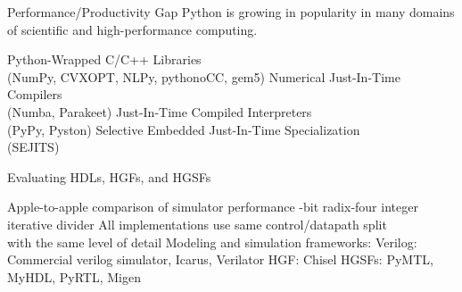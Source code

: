 \begin{frame}{Performance/Productivity Gap}
Python is growing in popularity in many domains of scientific and
high-performance computing. 

\medskip\hspace{0.15in}
\begin{cbxlist}
  \1 Python-Wrapped C/C++ Libraries \\
     (NumPy, CVXOPT, NLPy, pythonoCC, gem5)
  \1 Numerical Just-In-Time Compilers \\
     (Numba, Parakeet)
  \1 Just-In-Time Compiled Interpreters \\
     (PyPy, Pyston)
  \1 Selective Embedded Just-In-Time Specialization \\
     (SEJITS)
\end{cbxlist}

\end{frame}


%
%

\begin{frame}{Evaluating HDLs, HGFs, and HGSFs}
\begin{cbxlist}
  \1 Apple-to-apple comparison of simulator performance
  -bit radix-four integer iterative divider
  \1 All implementations use same control/datapath split \\ with the same
     level of detail
  \1 Modeling and simulation frameworks:
    \2 Verilog: Commercial verilog simulator, Icarus, Verilator
    \2 HGF: Chisel
    \2 HGSFs: PyMTL, MyHDL, PyRTL, Migen
\end{cbxlist}
\end{frame}

